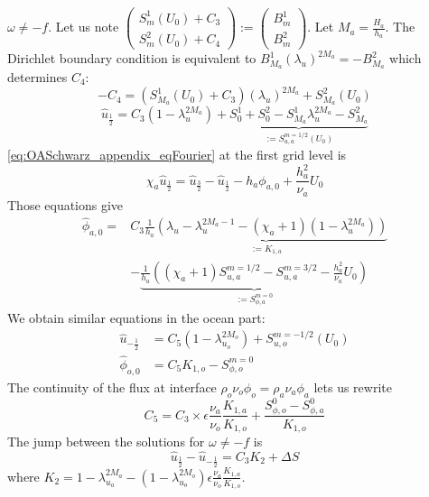 \begin{subappendices}
\begin{itemize}
$\omega\neq -f$.
Let us note 
$\begin{pmatrix}
	S_m^1(U_0) + {C}_3\\
	S_m^2(U_0) + {C}_4
\end{pmatrix}:=\begin{pmatrix}
B_m^1\\
B_m^2
\end{pmatrix}$.
Let $M_a=\frac{H_a}{h_a}$.
The Dirichlet boundary condition is equivalent to
$B_{M_a}^1 (\lambda_u)^{2M_a} = - B_{M_a}^2$ which determines
${C}_4$:
\begin{equation}
- {C}_4 = \left(S_{M_a}^1(U_0) + {C}_3\right)
	(\lambda_u)^{2M_a} + S_{M_a}^2(U_0)
\end{equation}
\begin{equation}
		\widehat{u}_{\frac{1}{2}} = {C}_3 (1 - \lambda_u^{2M_a})
	+ \underbrace{S_0^1+S_0^2 - S_{M_a}^1 \lambda_u^{2M_a}
		-S_{M_a}^2}_{:=S_{u, a}^{m=1/2}(U_0)}
\end{equation}
\eqref{eq:OASchwarz_appendix_eqFourier} at the first grid level is
\begin{equation}
	\chi_a \widehat{u}_{\frac{1}{2}} =
	\widehat{u}_{\frac{3}{2}} - \widehat{u}_{\frac{1}{2}}
	- h_a \phi_{a,0} + \frac{h^2_a}{\nu_a} U_0
\end{equation}
Those equations give
\begin{equation}
	\begin{aligned}
		\widehat{\phi}_{a,0} =&{C}_3 \underbrace{\frac{1}{h_a}
		\left(
			\lambda_u-\lambda_u^{2M_a-1}
			- (\chi_a+1)(1-\lambda_u^{2M_a})
			\right)}_{:=K_{1,a}}\\
		&-\underbrace{\frac{1}{h_a}\left((\chi_a + 1) S_{u,a}^{m=1/2}
		- S_{u,a}^{m=3/2}
		- \frac{h_a^2}{\nu_a} U_0\right)}_{:=S_{\phi,a}^{m=0}}
	\end{aligned}
\end{equation}
We obtain similar equations in the ocean part:
\begin{equation}
	\begin{aligned}
		\widehat{u}_{-\frac{1}{2}} &= {C}_5 (1 -
			\lambda_{u_o}^{2M_o})
			+ S_{u, o}^{m=-1/2}(U_0) \\
		\widehat{\phi}_{o,0} &={C}_5 K_{1,o}
		-S_{\phi,o}^{m=0}
	\end{aligned}
\end{equation}
The continuity of the flux at interface
$\rho_o \nu_o \phi_o = \rho_a \nu_a \phi_a$ lets us rewrite
\begin{equation}
{C}_5 = {C}_3 \times \epsilon
	\frac{\nu_a}{\nu_o} \frac{K_{1,a}}{K_{1,o}} +
	\frac{S_{\phi,o}^0 - S^0_{\phi, a}}{K_{1,o}}
\end{equation}
The jump between the solutions for $\omega\neq -f$ is
\begin{equation}
	\widehat{u}_{\frac{1}{2}} - \widehat{u}_{-\frac{1}{2}}
	= {C}_3 K_{2} + \Delta S
\end{equation}
where $K_{2} = 1 - \lambda_{u_a}^{2M_a} - (1 - \lambda_{u_o}^{2M_o})
\epsilon \frac{\nu_a}{\nu_o} \frac{K_{1,a}}{K_{1,o}}$.
\end{itemize}

\end{subappendices}
